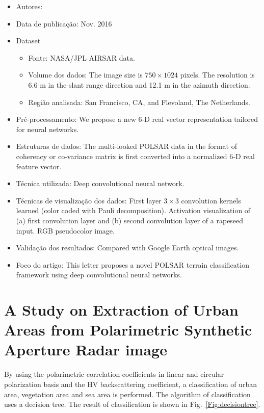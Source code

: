 \documentclass[paper=a4, fontsize=11pt]{scrartcl}
\begin{document}
\begin{itemize}
    \item Autores:~\cite{zhou2016polarimetric}
    \item Data de publicação: Nov. 2016 
    \item Dataset
    \begin{itemize}
        \item Fonte: NASA/JPL AIRSAR data.
        \item Volume dos dados: The image size is $750 \times 1024$ pixels. The resolution is 6.6 m in the slant range direction and 12.1 m in the azimuth direction.
        \item Região analisada: San Francisco, CA, and Flevoland, The Netherlands.
    \end{itemize}
    \item Pré-processamento: We propose a new 6-D real vector representation tailored for neural networks.
    \item Estruturas de dados: The multi-looked POLSAR data in the format of coherency or co-variance matrix is first converted into a normalized 6-D real feature vector.
    \item Técnica utilizada: Deep convolutional neural network.
    \item Técnicas de visualização dos dados: First layer $3 \times 3$ convolution kernels learned (color coded with Pauli decomposition). Activation visualization of (a) first convolution layer and (b) second convolution layer of a rapeseed input. RGB pseudocolor image.
    \item Validação dos resultados: Compared with Google Earth optical images.
    \item Foco do artigo: This letter proposes a novel POLSAR terrain classification framework using deep convolutional neural networks.    
\end{itemize}

\newpage

\section*{A Study on Extraction of Urban Areas from Polarimetric Synthetic Aperture Radar image}

By using the polarimetric correlation coefficients in linear and circular polarization basis and the HV backscattering coefficient, a classification of urban area, vegetation area and sea area is performed. 
The algorithm of classification uses a decision tree. 
The result of classification is shown in Fig.~\ref{Fig:decisiontree}.
\end{document}
